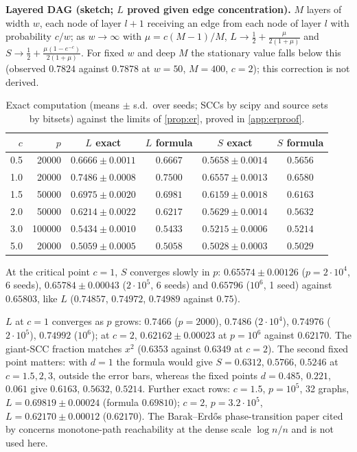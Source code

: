 \textbf{Layered DAG (sketch; $L$ proved given edge concentration).} $M$ layers of
width $w$, each node of layer $l+1$ receiving an edge from each node of layer $l$
with probability $c/w$; as $w\to\infty$ with $\mu=c(M-1)/M$,
$L\to\tfrac12+\frac\mu{2(1+\mu)}$ and
$S\to\tfrac12+\frac{\mu(1-e^{-c})}{2(1+\mu)}$. For fixed $w$ and deep $M$ the
stationary value falls below this (observed $0.7824$ against $0.7878$ at
$w=50$, $M=400$, $c=2$); this correction is not derived.

\begin{table}[h]
\caption{Exact computation (means $\pm$ s.d.\ over seeds; SCCs by scipy and source sets by bitsets) against the limits of \cref{prop:er}, proved in \cref{app:erproof}.}
\label{tab:er}
\centering\small
\begin{tabular}{rrcccc}
\toprule
$c$ & $p$ & $L$ exact & $L$ formula & $S$ exact & $S$ formula \\
\midrule
0.5 & 20000 & $0.6666\pm0.0011$ & $0.6667$ & $0.5658\pm0.0014$ & $0.5656$ \\
1.0 & 20000 & $0.7486\pm0.0008$ & $0.7500$ & $0.6557\pm0.0013$ & $0.6580$ \\
1.5 & 50000 & $0.6975\pm0.0020$ & $0.6981$ & $0.6159\pm0.0018$ & $0.6163$ \\
2.0 & 50000 & $0.6214\pm0.0022$ & $0.6217$ & $0.5629\pm0.0014$ & $0.5632$ \\
3.0 & 100000 & $0.5434\pm0.0010$ & $0.5433$ & $0.5215\pm0.0006$ & $0.5214$ \\
5.0 & 20000 & $0.5059\pm0.0005$ & $0.5058$ & $0.5028\pm0.0003$ & $0.5029$ \\
\bottomrule
\end{tabular}
\end{table}
At the critical point $c=1$, $S$ converges slowly in $p$: $0.65574\pm0.00126$ ($p=2\cdot10^4$, 6 seeds),
$0.65784\pm0.00043$ ($2\cdot10^5$, 6 seeds) and $0.65796$ ($10^6$, 1 seed) against $0.65803$, like $L$
($0.74857$, $0.74972$, $0.74989$ against $0.75$).

$L$ at $c=1$ converges as $p$ grows: $0.7466$ ($p=2000$), $0.7486$ ($2\cdot10^4$),
$0.74976$ ($2\cdot10^5$), $0.74992$ ($10^6$); at $c=2$, $0.62162\pm0.00023$ at
$p=10^6$ against $0.62170$. The giant-SCC fraction matches $x^2$ ($0.6353$ against
$0.6349$ at $c=2$). The second fixed point matters: with $d=1$ the formula would
give $S=0.6312$, $0.5766$, $0.5246$ at $c=1.5,2,3$, outside the error bars,
whereas the fixed points $d=0.485$, $0.221$, $0.061$ give $0.6163$, $0.5632$,
$0.5214$. Further exact rows: $c=1.5$, $p=10^5$, 32 graphs, $L=0.69819\pm0.00024$
(formula $0.69810$); $c=2$, $p=3.2\cdot10^5$, $L=0.62170\pm0.00012$ ($0.62170$).
The Barak--Erd\H{o}s phase-transition paper cited by \citet{reisach2026topological}
concerns monotone-path reachability at the dense scale $\log n/n$ and is not
used here.

